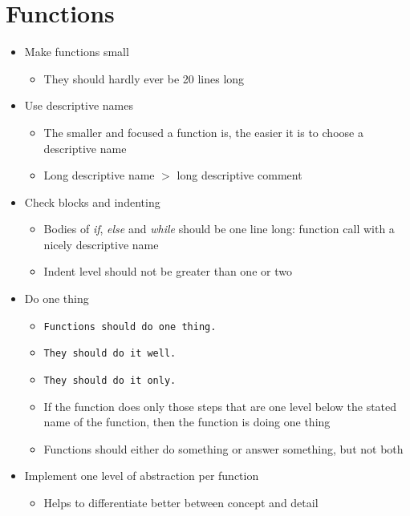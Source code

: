 
\section{Functions}
\begin{itemize}
    \item Make functions small
    \begin{itemize}
        \item They should hardly ever be 20 lines long
    \end{itemize}
    \item Use descriptive names
    \begin{itemize}
        \item The smaller and focused a function is, the easier it is to choose a descriptive name
        \item Long descriptive name $>$ long descriptive comment
    \end{itemize}
    \item Check blocks and indenting
    \begin{itemize}
        \item Bodies of \textit{if}, \textit{else} and \textit{while} should be one line long:
        function call with a nicely descriptive name
        \item Indent level should not be greater than one or two
    \end{itemize}
    \item Do one thing
    \begin{itemize}
        \item \texttt{Functions should do one thing.}
        \item [] \texttt{They should do it well.}
        \item [] \texttt{They should do it only.}
        \item If the function does only those steps that are one level below the stated name of the function,
        then the function is doing one thing
        \item Functions should either do something or answer something, but not both
    \end{itemize}
    \item Implement one level of abstraction per function
    \begin{itemize}
        \item Helps to differentiate better between concept and detail
    \end{itemize}

\end{itemize}
